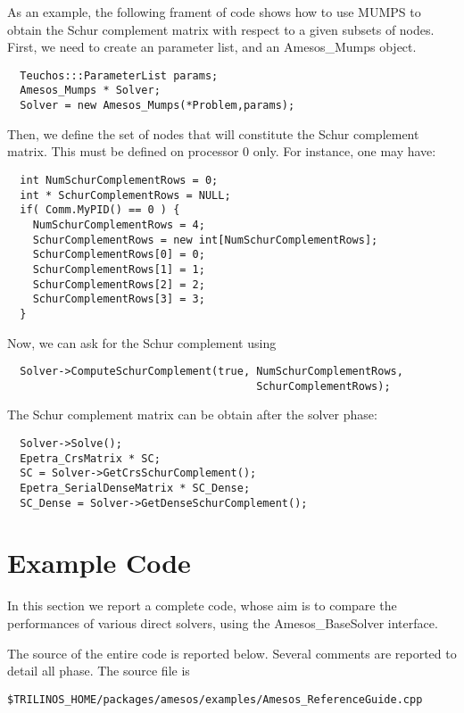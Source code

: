\documentclass[11pt]{SANDreport}
\begin{document}
As an example, the following frament of code shows how to use MUMPS to
obtain the Schur complement matrix with respect to a given subsets of
nodes.  First, we need to create an parameter list, and an Amesos\_Mumps
object.
\begin{verbatim}
  Teuchos:::ParameterList params;
  Amesos_Mumps * Solver;
  Solver = new Amesos_Mumps(*Problem,params);
\end{verbatim}
Then, we define the set of nodes that will constitute the Schur
complement matrix. This must be defined on processor 0 only. For
instance, one may have:
\begin{verbatim}
  int NumSchurComplementRows = 0;
  int * SchurComplementRows = NULL;
  if( Comm.MyPID() == 0 ) {
    NumSchurComplementRows = 4;
    SchurComplementRows = new int[NumSchurComplementRows];
    SchurComplementRows[0] = 0;
    SchurComplementRows[1] = 1; 
    SchurComplementRows[2] = 2;
    SchurComplementRows[3] = 3;
  }
\end{verbatim}
Now, we can ask for the Schur complement using
\begin{verbatim}  
  Solver->ComputeSchurComplement(true, NumSchurComplementRows,
                                       SchurComplementRows);
\end{verbatim}
The Schur complement matrix can be obtain after the solver phase:  
\begin{verbatim}  
  Solver->Solve();
  Epetra_CrsMatrix * SC;
  SC = Solver->GetCrsSchurComplement();
  Epetra_SerialDenseMatrix * SC_Dense;
  SC_Dense = Solver->GetDenseSchurComplement();
\end{verbatim}




\section{Example Code}
\label{sec:comparison}

In this section we report a complete code, whose aim is to compare the
performances of various direct solvers, using the Amesos\_BaseSolver
interface. 

The source of the entire code is reported below. Several comments are
reported to detail all phase. The source file is
\begin{verbatim}
$TRILINOS_HOME/packages/amesos/examples/Amesos_ReferenceGuide.cpp
\end{verbatim}
\end{document}
